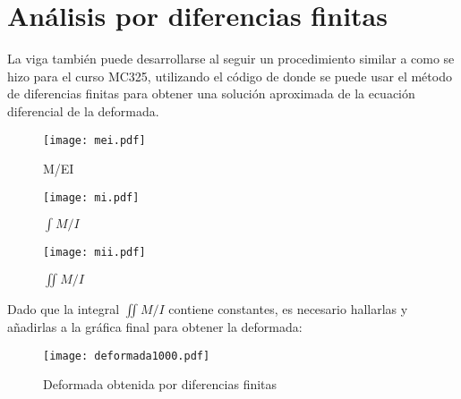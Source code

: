 \documentclass[11pt,a4paper]{article}
\begin{document}
\section*{Análisis por diferencias finitas}
La viga también puede desarrollarse al seguir un procedimiento similar a como se hizo para el curso MC325, utilizando el código de \cite{finite_difference} donde se puede usar el método de diferencias finitas para obtener una solución aproximada de la ecuación diferencial de la deformada. 
\begin{figure}[H]
    \centering
    \texttt{[image: mei.pdf]}
    \caption{M/EI}
\end{figure}
\begin{figure}[H]
    \centering
    \texttt{[image: mi.pdf]}
    \caption{$\int M/I$}
\end{figure}
\begin{figure}[H]
    \centering
    \texttt{[image: mii.pdf]}
    \caption{$\iint M/I$}
\end{figure}
Dado que la integral $\iint M/I$ contiene constantes, es necesario hallarlas y añadirlas a la gráfica final para obtener la deformada:
\begin{figure}[H]
    \centering
    \texttt{[image: deformada1000.pdf]}
    \caption{Deformada obtenida por diferencias finitas}
\end{figure}
\end{document}
